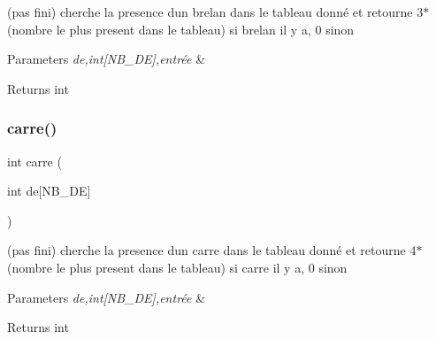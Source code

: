 (pas fini) cherche la presence d\textquotesingle{}un brelan dans le tableau donné et retourne 3$\ast$(nombre le plus present dans le tableau) si brelan il y a, 0 sinon 


\begin{DoxyParams}{Parameters}
{\em de,int\mbox{[}\+N\+B\+\_\+\+D\+E\mbox{]},entrée} & \\
\hline
\end{DoxyParams}
\begin{DoxyReturn}{Returns}
int 
\end{DoxyReturn}
\mbox{\label{yams___cleo___martin-_colleu__2_80_8c_ab1e379715ffd22122d1dcb633f7737c5}} 
\subsubsection{\texorpdfstring{carre()}{carre()}}
{\footnotesize\ttfamily int carre (\begin{DoxyParamCaption}\item[{int}]{de\mbox{[}\+N\+B\+\_\+\+D\+E\mbox{]} }\end{DoxyParamCaption})}



(pas fini) cherche la presence d\textquotesingle{}un carre dans le tableau donné et retourne 4$\ast$(nombre le plus present dans le tableau) si carre il y a, 0 sinon 


\begin{DoxyParams}{Parameters}
{\em de,int\mbox{[}\+N\+B\+\_\+\+D\+E\mbox{]},entrée} & \\
\hline
\end{DoxyParams}
\begin{DoxyReturn}{Returns}
int 
\end{DoxyReturn}
\mbox{\label{yams___cleo___martin-_colleu__2_80_8c_ae0d4fb89370e27251e605e929c9af0bf}} 
